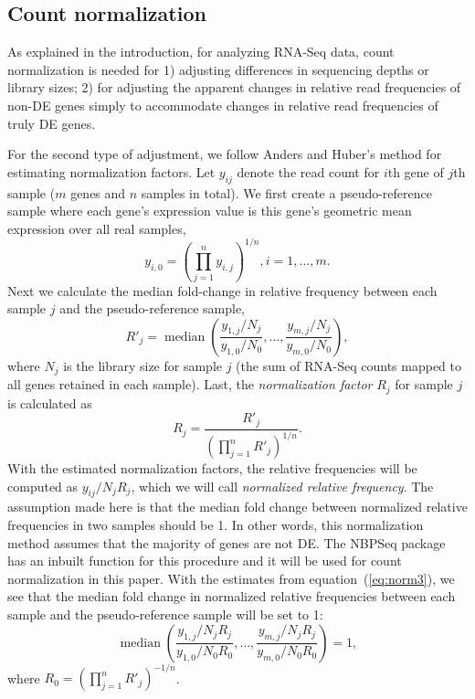 \documentclass[letterpaper,12pt]{article}
\DeclareMathOperator{\median}{median}
\begin{document}
\subsection{Count normalization}\label{section:countNormalization}
As explained in the introduction, for analyzing RNA-Seq data, count
normalization is needed for 1) adjusting differences in sequencing depths or
library sizes; 2) for adjusting the apparent changes in relative read
frequencies of non-DE genes simply to accommodate changes in relative read
frequencies of truly DE genes.

For the second type of adjustment, we follow Anders and Huber's method
\citep{anders2010differential} for 
estimating normalization factors.  Let $y_{ij}$ denote the read count
for $i$th gene of $j$th sample ($m$ genes and $n$ samples in total). We first
create a pseudo-reference sample where each gene's expression value is this
gene's geometric mean expression over all real samples,
\begin{equation}
 y_{i,0} = (\prod_{j=1}^ny_{i,j})^{1/n},  i=1, \ldots, m. 
\end{equation} 
Next we calculate the median fold-change in relative frequency between
each sample $j$ and the pseudo-reference sample,
\begin{equation}\label{eq:normfactors} 
    R'_j = \median \left(\dfrac{y_{1,j}/N_j}{y_{1,0}/N_{0}}, \ldots, \dfrac{y_{m,j}/N_j}{y_{m,0}/N_{0}}\right),
\end{equation}
where $N_j$ is the library size for sample $j$ (the sum of RNA-Seq
counts mapped to all genes retained in each sample). Last, the
\textit{normalization factor}  $R_j$ for sample $j$ is calculated as 
\begin{equation}
    \label{eq:norm3}
R_j = \dfrac{R'_j}{(\prod_{j=1}^{n}R'_j)^{1/n}}.
\end{equation}
With the estimated normalization factors, the relative frequencies will be
computed as $y_{ij}/{N_j R_j}$, which we will call {\em normalized relative
frequency}. The assumption made here is that the
median fold change between normalized relative frequencies in two samples should be 1. In
other words, this normalization method assumes that the majority of genes are
not DE. The NBPSeq package \citep{di2014package} has an inbuilt function for
this procedure and it will be used for count normalization in this paper. With
the estimates from equation~(\ref{eq:norm3}), we see that the median fold
change in normalized relative frequencies between each sample and the pseudo-reference
sample will be set to 1:
\begin{equation}
    \label{eq:medianfc}
    \median \left(\dfrac{y_{1,j}/ N_jR_j}{y_{1,0}/N_{0}R_0}, \ldots,
    \dfrac{y_{m,j}/N_j R_j}{y_{m,0}/N_{0}R_0} \right) = 1,
\end{equation}
where $R_0 = (\prod_{j=1}^{n}R'_j)^{-1/n}$.
\end{document}

